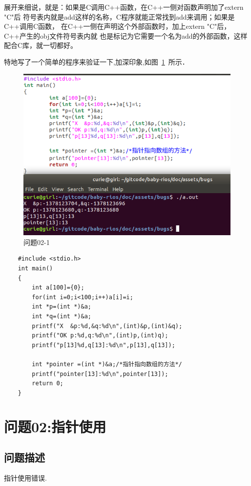 展开来细说，就是：如果是C调用C++函数，在C++一侧对函数声明加了extern "C"后
符号表内就是add这样的名称，C程序就能正常找到add来调用；如果是C++调用C函数，
在C++一侧在声明这个外部函数时，加上extern "C"后，C++产生的obj文件符号表内就
也是标记为它需要一个名为add的外部函数，这样配合C库，就一切都好。

特地写了一个简单的程序来验证一下,加深印象,如图~\ref{problem02_1}~所示．	

\begin{figure}[!htbp]
		\centering	\includegraphics[width=14cm]{pic/assets/problems/problem02_1}
        \caption{问题02-1}	\label{problem02_1}	\end{figure}
        
\begin{verbatim}
    #include <stdio.h>
    int main()
    {
        int a[100]={0};
        for(int i=0;i<100;i++)a[i]=i;
        int *p=(int *)&a;
        int *q=(int *)&a;
        printf("X  &p:%d,&q:%d\n",(int)&p,(int)&q);
        printf("OK p:%d,q:%d\n",(int)p,(int)q);
        printf("p[13]%d,q[13]:%d\n",p[13],q[13]);
    
        int *pointer =(int *)&a;/*指针指向数组的方法*/
        printf("pointer[13]:%d\n",pointer[13]);
        return 0;
    }
\end{verbatim}

\section{问题02:指针使用}
\subsection{问题描述}
指针使用错误.
